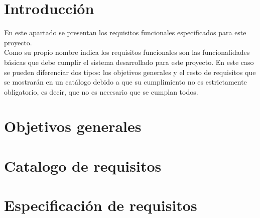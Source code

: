 
\section{Introducción}
En este apartado se presentan los requisitos funcionales especificados para este proyecto.\\
Como su propio nombre indica los requisitos funcionales son las funcionalidades básicas que debe cumplir el sistema desarrollado para este proyecto. En este caso se pueden diferenciar dos tipos: los objetivos generales y el resto de requisitos que se mostrarán en un catálogo debido a que su cumplimiento no es estrictamente obligatorio, es decir, que no es necesario que se cumplan todos.

\section{Objetivos generales}

\section{Catalogo de requisitos}

\section{Especificación de requisitos}


